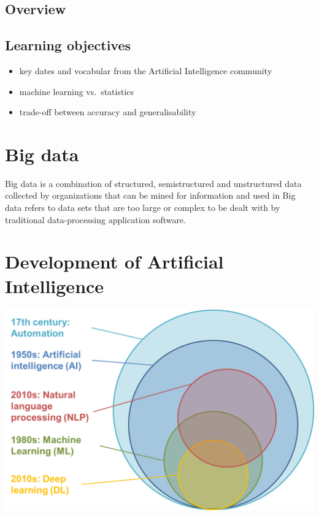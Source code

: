 \documentclass[
  letterpaper,
  DIV=11,
  numbers=noendperiod,
  oneside]{scrreprt}
\begin{document}
\hypertarget{overview-8}{%
\subsection{Overview}\label{overview-8}}

\hypertarget{learning-objectives-8}{%
\subsection{Learning objectives}\label{learning-objectives-8}}

\begin{itemize}
\item
  key dates and vocabular from the Artificial Intelligence community
\item
  machine learning vs.~statistics
\item
  trade-off between accuracy and generalisability
\end{itemize}

\hypertarget{big-data}{%
\section{Big data}\label{big-data}}

Big data is a combination of structured, semistructured and unstructured
data collected by organizations that can be mined for information and
used in Big data refers to data sets that are too large or complex to be
dealt with by traditional data-processing application software.

\hypertarget{development-of-artificial-intelligence}{%
\section{Development of Artificial
Intelligence}\label{development-of-artificial-intelligence}}

\includegraphics{./images/paste-FA238456.png}
\end{document}
